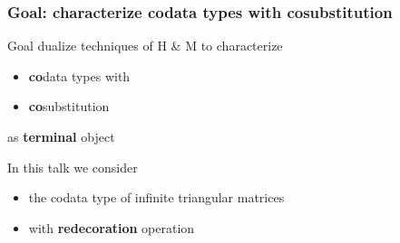 \documentclass[
]
{beamer}
\newcommand{\fat}[1]{\textbf{#1}}
\begin{document}
\begin{frame}
 \frametitle{Goal: characterize \fat{co}data types with \fat{co}substitution}
 
\begin{block}{Goal}
dualize techniques of H \& M to characterize
  \begin{itemize}
    \item
         \fat{co}data types with 
    \item\fat{co}substitution 
  \end{itemize}
    as  \fat{terminal} object
  
 \end{block}
  
\begin{block}{In this talk we consider}
 
  \begin{itemize} 
    \item the codata type of infinite triangular matrices
    \item with \fat{redecoration} operation
  \end{itemize}
\end{block} 
\end{frame}


\begin{comment}
\begin{frame}
 \frametitle{Binding signatures with (in)equations}
   \begin{block}{Equational theories}
    \begin{itemize}
     \item prime example: lambda calculus modulo $\beta$-equivalence
     \item Fiore with students Hur \& Mahmoud
     \item Hirschowitz \& Maggesi 
    \end{itemize}
   \end{block}
   
  \begin{block}{Reduction rules via \fat{in}equations}
   \begin{itemize}
    \item A., PhD thesis: 
     \begin{itemize}
      \item based on ideas by Hirschowitz \& Maggesi
      \item uses notion of \fat{relative} monad (Altenkirch et al. '10)
     \end{itemize}
   \end{itemize}
  \end{block}
  
  \begin{block}{Goal:}
   do the same for cosyntax, i.e.\ \fat{nested co}data types 
  \end{block}
\end{frame}
\end{comment}
\end{document}
